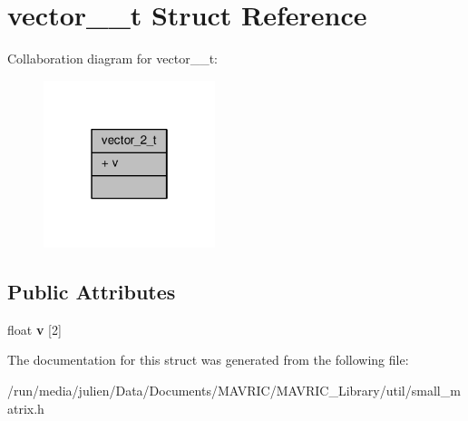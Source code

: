 \hypertarget{structvector__2__t}{\section{vector\+\_\+\_\+t Struct Reference}
\label{structvector__2__t}
}


Collaboration diagram for vector\+\_\+\_\+t\+:
\nopagebreak
\begin{figure}[H]
\begin{center}
\leavevmode
\includegraphics[width=142pt]{structvector__2__t__coll__graph}
\end{center}
\end{figure}
\subsection*{Public Attributes}
\begin{DoxyCompactItemize}
\item 
\hypertarget{structvector__2__t_a4282f9ec25833ce09374e8d77ab0e1e3}{float {\bfseries v} \mbox{[}2\mbox{]}}\label{structvector__2__t_a4282f9ec25833ce09374e8d77ab0e1e3}

\end{DoxyCompactItemize}


The documentation for this struct was generated from the following file\+:\begin{DoxyCompactItemize}
\item 
/run/media/julien/\+Data/\+Documents/\+M\+A\+V\+R\+I\+C/\+M\+A\+V\+R\+I\+C\+\_\+\+Library/util/small\+\_\+matrix.\+h\end{DoxyCompactItemize}
